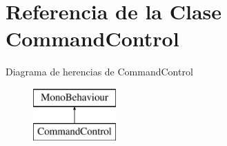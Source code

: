 \hypertarget{class_command_control}{}\section{Referencia de la Clase Command\+Control}
\label{class_command_control}
Diagrama de herencias de Command\+Control\begin{figure}[H]
\begin{center}
\leavevmode
\includegraphics[height=2.000000cm]{class_command_control}
\end{center}
\end{figure}

